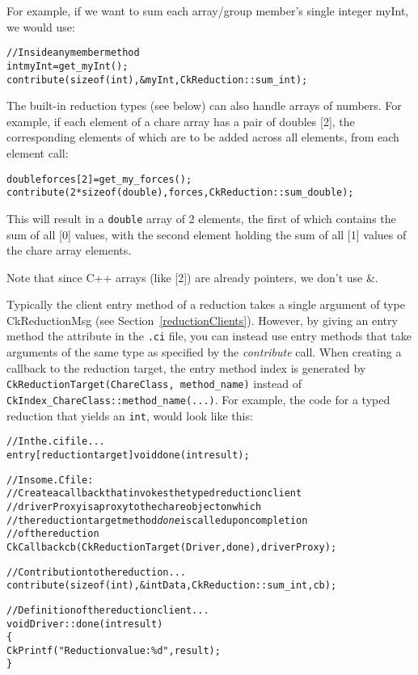 For example, if we want to sum each array/group member's single integer myInt, 
we would use:

\begin{alltt}
    // Inside any member method
    int myInt=get_myInt();
    contribute(sizeof(int),\&myInt,CkReduction::sum_int);
\end{alltt}

The built-in reduction types (see below) can also handle arrays of
numbers.  For example, if each element of a chare array has a pair of
doubles [2], the corresponding elements of which are to be added across
all elements, from each element call:

\begin{alltt}
    double forces[2]=get_my_forces();
    contribute(2*sizeof(double),forces,CkReduction::sum_double);
\end{alltt}

This will result in a {\tt double} array of 2 elements, the first of which
contains the sum of all [0] values, with the second element 
holding the sum of all [1] values of the chare array elements.

Note that since C++ arrays (like [2]) are already pointers, we 
don't use \&.


Typically the client entry method of a reduction takes a single argument of
type CkReductionMsg (see Section~\ref{reductionClients}). However, by giving an entry method the
 attribute in the {\tt .ci} file, you can instead use entry methods that take
arguments of the same type as specified by the {\em contribute} call.  
When creating a callback to the
reduction target, the entry method index is generated by 
{\tt CkReductionTarget(ChareClass, method\_name)} 
instead of {\tt CkIndex\_ChareClass::method\_name(...)}.
For example,
the code for a typed reduction that yields an {\tt int}, would look like this:

\begin{alltt}
  // In the .ci file...
  entry [reductiontarget] void done(int result);

  // In some .C file: 
  // Create a callback that invokes the typed reduction client
  // driverProxy is a proxy to the chare object on which 
  // the reduction target method {\em done} is called upon completion 
  // of the reduction
  CkCallback cb(CkReductionTarget(Driver, done), driverProxy);

  // Contribution to the reduction...
  contribute(sizeof(int), &intData, CkReduction::sum_int, cb);

  // Definition of the reduction client...
  void Driver::done(int result) 
  \{
    CkPrintf("Reduction value: \%d", result);
  \}
\end{alltt}

